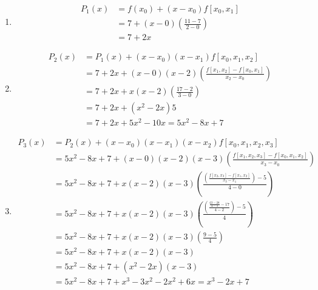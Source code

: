 \documentclass[12pt]{article}
\newenvironment{problem}[2][Problem]{\begin{trivlist}
\item[\hskip \labelsep {\bfseries #1}\hskip \labelsep {\bfseries #2.}]}{\end{trivlist}}
\begin{document}
\begin{enumerate}
	\item \begin{align*}
			P_1(x) &= f(x_0) + (x - x_0)f[x_0, x_1]\\
			&= 7 + (x - 0)(\frac{11-7}{2-0})\\
			&= 7 + 2x
		  \end{align*}
	\item \begin{align*}
			P_2(x) &= P_1(x) + (x - x_0)(x - x_1)f[x_0, x_1, x_2]\\
			&= 7 + 2x + (x - 0)(x - 2)(\frac{f[x_1, x_2] - f[x_0, x_1]}{x_2 - x_0})\\
			&= 7 + 2x + x(x-2)(\frac{17 - 2}{3-0})\\
			&= 7 + 2x + (x^2 - 2x)5\\
			&= 7 + 2x + 5x^2 - 10x = 5x^2 - 8x + 7
		  \end{align*}
	\item \begin{align*}
			P_3(x) &= P_2(x) + (x - x_0)(x - x_1)(x - x_2)f[x_0, x_1, x_2, x_3]\\
			&= 5x^2 - 8x + 7 + (x - 0)(x - 2)(x - 3)(\frac{f[x_1, x_2, x_3] - f[x_0, x_1, x_2]}{x_3 - x_0})\\
			&= 5x^2 - 8x + 7 + x(x-2)(x-3)(\frac{(\frac{f[x_2, x_3] - f[x_1, x_2]}{x_3 - x_1}) - 5}{4 - 0})\\
			&= 5x^2 - 8x + 7 + x(x-2)(x-3)(\frac{(\frac{\frac{63-28}{4-3} - 17}{4 - 2}) - 5}{4})\\
			&= 5x^2 - 8x + 7 + x(x-2)(x-3)(\frac{9 - 5}{4})\\
			&= 5x^2 - 8x + 7 + x(x-2)(x-3)\\
			&= 5x^2 - 8x + 7 + (x^2 - 2x)(x - 3)\\
			&= 5x^2 - 8x + 7 + x^3 - 3x^2 - 2x^2 + 6x = x^3 - 2x + 7
		  \end{align*}
\end{enumerate}

\begin{problem}{3}
\end{problem}
\end{document}
